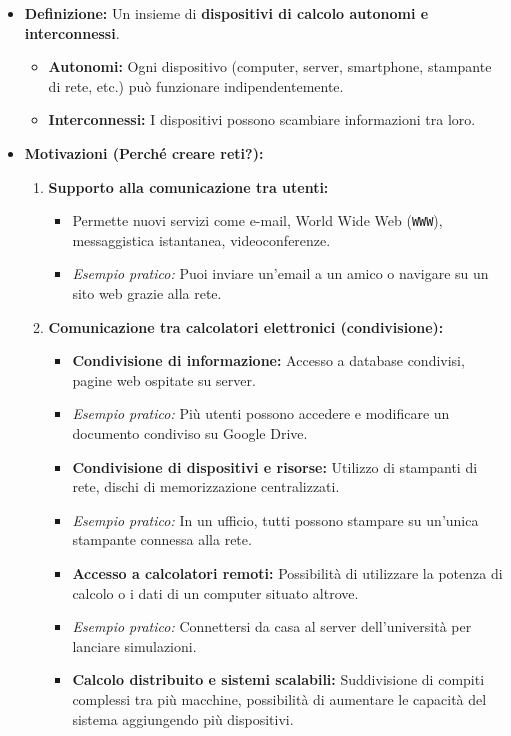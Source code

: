 \begin{itemize}
    \item \textbf{Definizione:} Un insieme di \textbf{dispositivi di calcolo autonomi e interconnessi}.
    \begin{itemize}
        \item \textbf{Autonomi:} Ogni dispositivo (computer, server, smartphone, stampante di rete, etc.) può funzionare indipendentemente.
        \item \textbf{Interconnessi:} I dispositivi possono scambiare informazioni tra loro.
    \end{itemize}
    \item \textbf{Motivazioni (Perché creare reti?):}
    \begin{enumerate}
        \item \textbf{Supporto alla comunicazione tra utenti:}
        \begin{itemize}
            \item Permette nuovi servizi come e-mail, World Wide Web (\texttt{WWW}), messaggistica istantanea, videoconferenze.
            \item \textit{Esempio pratico:} Puoi inviare un'email a un amico o navigare su un sito web grazie alla rete.
        \end{itemize}
        \item \textbf{Comunicazione tra calcolatori elettronici (condivisione):}
        \begin{itemize}
            \item \textbf{Condivisione di informazione:} Accesso a database condivisi, pagine web ospitate su server.
            \item \textit{Esempio pratico:} Più utenti possono accedere e modificare un documento condiviso su Google Drive.
            \item \textbf{Condivisione di dispositivi e risorse:} Utilizzo di stampanti di rete, dischi di memorizzazione centralizzati.
            \item \textit{Esempio pratico:} In un ufficio, tutti possono stampare su un'unica stampante connessa alla rete.
            \item \textbf{Accesso a calcolatori remoti:} Possibilità di utilizzare la potenza di calcolo o i dati di un computer situato altrove.
            \item \textit{Esempio pratico:} Connettersi da casa al server dell'università per lanciare simulazioni.
            \item \textbf{Calcolo distribuito e sistemi scalabili:} Suddivisione di compiti complessi tra più macchine, possibilità di aumentare le capacità del sistema aggiungendo più dispositivi.

\end{itemize}
\end{enumerate}
\end{itemize}
